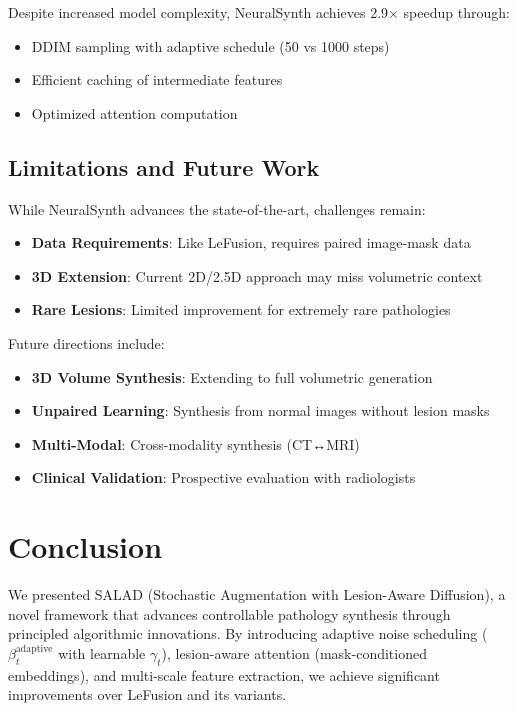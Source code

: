 \documentclass[10pt,twocolumn,letterpaper]{article}
\begin{document}
Despite increased model complexity, NeuralSynth achieves 2.9× speedup through:
\begin{itemize}
    \item DDIM sampling with adaptive schedule (50 vs 1000 steps)
    \item Efficient caching of intermediate features
    \item Optimized attention computation
\end{itemize}

\subsection{Limitations and Future Work}

While NeuralSynth advances the state-of-the-art, challenges remain:
\begin{itemize}
    \item \textbf{Data Requirements}: Like LeFusion, requires paired image-mask data
    \item \textbf{3D Extension}: Current 2D/2.5D approach may miss volumetric context
    \item \textbf{Rare Lesions}: Limited improvement for extremely rare pathologies
\end{itemize}

Future directions include:
\begin{itemize}
    \item \textbf{3D Volume Synthesis}: Extending to full volumetric generation
    \item \textbf{Unpaired Learning}: Synthesis from normal images without lesion masks
    \item \textbf{Multi-Modal}: Cross-modality synthesis (CT↔MRI)
    \item \textbf{Clinical Validation}: Prospective evaluation with radiologists
\end{itemize}

\section{Conclusion}

We presented SALAD (Stochastic Augmentation with Lesion-Aware Diffusion), a novel framework that advances controllable pathology synthesis through principled algorithmic innovations. By introducing adaptive noise scheduling ($\beta_t^{\text{adaptive}}$ with learnable $\gamma_t$), lesion-aware attention (mask-conditioned embeddings), and multi-scale feature extraction, we achieve significant improvements over LeFusion and its variants.
\end{document}
